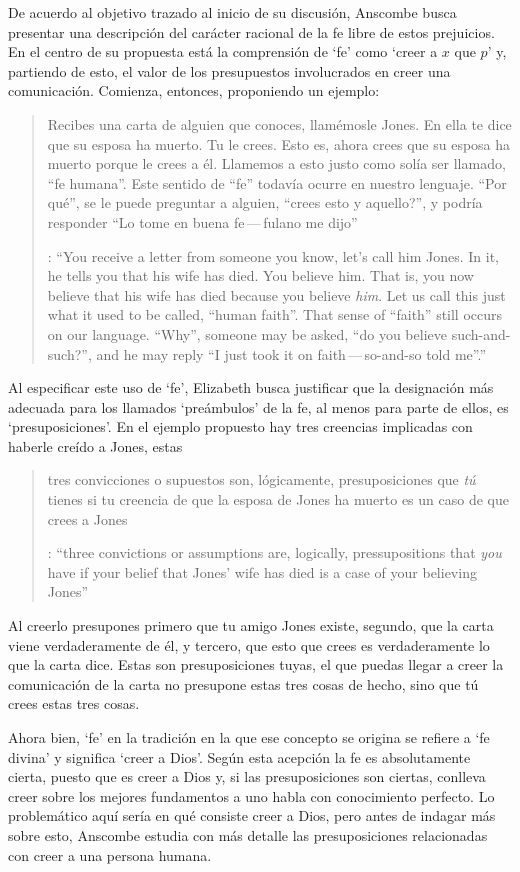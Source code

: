 De acuerdo al objetivo trazado al inicio de su discusión, Anscombe busca presentar una descripción del carácter racional de la fe libre de estos prejuicios. En el centro de su propuesta está la comprensión de `fe' como `creer a $x$ que $p$' y, partiendo de esto, el valor de los presupuestos involucrados en creer una comunicación. Comienza, entonces, proponiendo un ejemplo: \blockquote[{\cite[114]{anscombe1981erp:faith}}: \enquote{You receive a letter from someone you know, let's call him Jones. In it, he tells you that his wife has died. You believe him. That is, you now believe that his wife has died because you believe \emph{him}. Let us call this just what it used to be called, ``human faith''. That sense of ``faith'' still occurs on our language. ``Why'', someone may be asked, ``do you believe such-and-such?'', and he may reply ``I just took it on faith\,---\,so-and-so told me''.}]{Recibes una carta de alguien que conoces, llamémosle Jones. En ella te dice que su esposa ha muerto. Tu le crees. Esto es, ahora crees que su esposa ha muerto porque le crees a él. Llamemos a esto justo como solía ser llamado, ``fe humana''. Este sentido de ``fe'' todavía ocurre en nuestro lenguaje. ``Por qué'', se le puede preguntar a alguien, ``crees esto y aquello?'', y podría responder ``Lo tome en buena fe\,---\,fulano me dijo''}. Al especificar este uso de `fe', Elizabeth busca justificar que la designación más adecuada para los llamados `preámbulos' de la fe, al menos para parte de ellos, es `presuposiciones'. En el ejemplo propuesto hay tres creencias implicadas con haberle creído a Jones, estas \blockquote[{\cite[114]{anscombe1981erp:faith}}: \enquote{three convictions or assumptions are, logically, pressupositions that \emph{you} have if your belief that Jones' wife has died is a case of your believing Jones}]{tres convicciones o supuestos son, lógicamente, presuposiciones que \emph{tú} tienes si tu creencia de que la esposa de Jones ha muerto es un caso de que crees a Jones}.

Al creerlo presupones primero que tu amigo Jones existe, segundo, que la carta viene verdaderamente de él, y tercero, que esto que crees es verdaderamente lo que la carta dice. Estas son presuposiciones tuyas, el que puedas llegar a creer la comunicación de la carta no presupone estas tres cosas de hecho, sino que tú crees estas tres cosas.

Ahora bien, `fe' en la tradición en la que ese concepto se origina se refiere a `fe divina' y significa `creer a Dios'. Según esta acepción la fe es absolutamente cierta, puesto que es creer a Dios y, si las presuposiciones son ciertas, conlleva creer sobre los mejores fundamentos a uno habla con conocimiento perfecto. Lo problemático aquí sería en qué consiste creer a Dios, pero antes de indagar más sobre esto, Anscombe estudia con más detalle las presuposiciones relacionadas con creer a una persona humana.


